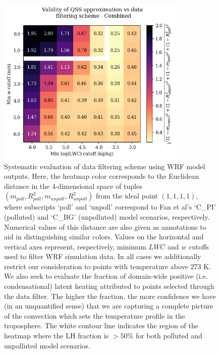 \documentclass{article}
\begin{document}
\begin{figure}[ht]
    \centering
    \includegraphics[width=9cm]{revmywrf/v1_FINAL_from_data_combo_heatmap_figure.png}
    \caption{Systematic evaluation of data filtering scheme using WRF model outputs. Here, the heatmap color corresponds to the Euclidean distance in the 4-dimensional space of tuples $(m_{poll}, R^2_{poll}, m_{unpoll}, R^2_{unpoll})$ from the ideal point $(1, 1, 1, 1)$, where subscripts `poll' and `unpoll' correspond to Fan et al's `C\_PI' (polluted) and `C\_BG' (unpolluted) model scenarios, respectively. Numerical values of this distance are also given as annotations to aid in distinguishing similar colors. Values on the horizontal and vertical axes represent, respectively, minimum $LWC$ and $w$ cutoffs used to filter WRF simulation data. In all cases we additionally restrict our consideration to points with temperature above 273 K. We also seek to evaluate the fraction of domain-wide positive (i.e. condensational) latent heating attributed to points selected through the data filter. The higher the fraction, the more confidence we have (in an unquantified sense) that we are capturing a complete picture of the convection which sets the temperature profile in the troposphere. The white contour line indicates the region of the heatmap where the LH fraction is $> 50\%$ for both polluted and unpolluted model scenarios.}
    \label{comboheatmap}
\end{figure}
\end{document}
